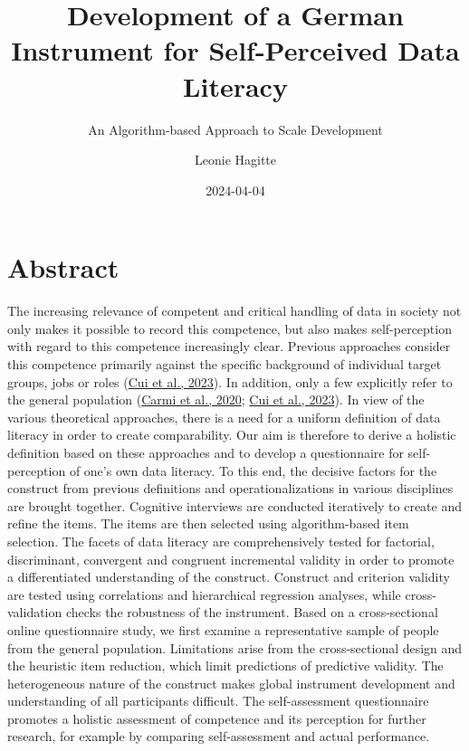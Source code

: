 \documentclass[
  12pt,
  a4paper,
  twoside]{article}
\title{Development of a German Instrument for Self-Perceived Data Literacy}
\subtitle{An Algorithm-based Approach to Scale Development}
\author{Leonie Hagitte}
\date{2024-04-04}
\begin{document}
\maketitle

{
\setcounter{tocdepth}{2}
\tableofcontents
}
\newpage\null\thispagestyle{empty}\newpage

\hypertarget{abstract}{%
\section*{Abstract}\label{abstract}}

The increasing relevance of competent and critical handling of data in society not only makes it possible to record this competence, but also makes self-perception with regard to this competence increasingly clear. Previous approaches consider this competence primarily against the specific background of individual target groups, jobs or roles (\protect\hyperlink{ref-Cui2023}{Cui et al., 2023}). In addition, only a few explicitly refer to the general population (\protect\hyperlink{ref-Carmi2020}{Carmi et al., 2020}; \protect\hyperlink{ref-Cui2023}{Cui et al., 2023}). In view of the various theoretical approaches, there is a need for a uniform definition of data literacy in order to create comparability.
Our aim is therefore to derive a holistic definition based on these approaches and to develop a questionnaire for self-perception of one's own data literacy. To this end, the decisive factors for the construct from previous definitions and operationalizations in various disciplines are brought together. Cognitive interviews are conducted iteratively to create and refine the items. The items are then selected using algorithm-based item selection. The facets of data literacy are comprehensively tested for factorial, discriminant, convergent and congruent incremental validity in order to promote a differentiated understanding of the construct. Construct and criterion validity are tested using correlations and hierarchical regression analyses, while cross-validation checks the robustness of the instrument.
Based on a cross-sectional online questionnaire study, we first examine a representative sample of people from the general population. Limitations arise from the cross-sectional design and the heuristic item reduction, which limit predictions of predictive validity. The heterogeneous nature of the construct makes global instrument development and understanding of all participants difficult.
The self-assessment questionnaire promotes a holistic assessment of competence and its perception for further research, for example by comparing self-assessment and actual performance.
\end{document}
